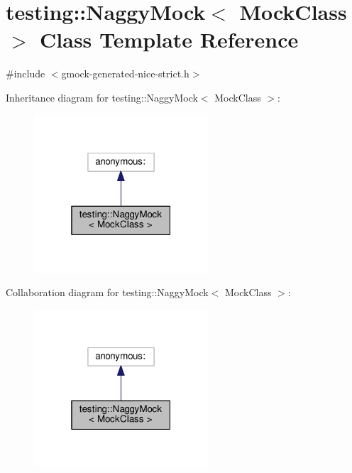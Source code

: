 \hypertarget{classtesting_1_1NaggyMock}{}\section{testing\+:\+:Naggy\+Mock$<$ Mock\+Class $>$ Class Template Reference}
\label{classtesting_1_1NaggyMock}


{\ttfamily \#include $<$gmock-\/generated-\/nice-\/strict.\+h$>$}



Inheritance diagram for testing\+:\+:Naggy\+Mock$<$ Mock\+Class $>$\+:\nopagebreak
\begin{figure}[H]
\begin{center}
\leavevmode
\includegraphics[width=184pt]{classtesting_1_1NaggyMock__inherit__graph}
\end{center}
\end{figure}


Collaboration diagram for testing\+:\+:Naggy\+Mock$<$ Mock\+Class $>$\+:\nopagebreak
\begin{figure}[H]
\begin{center}
\leavevmode
\includegraphics[width=184pt]{classtesting_1_1NaggyMock__coll__graph}
\end{center}
\end{figure}
